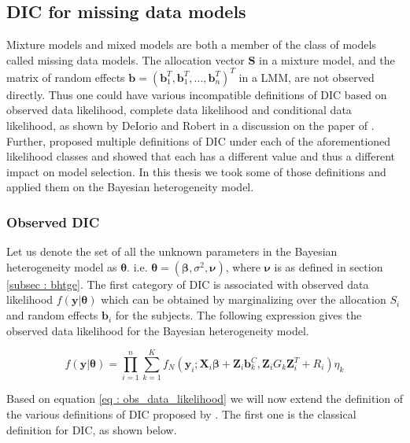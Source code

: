 \subsection{DIC for missing data models}
\label{subsec : DIC_missing_data_models}
Mixture models and mixed models are both a member of the class of models called missing data models. The allocation vector $\boldsymbol{S}$ in a mixture model, and the matrix of random effects $\boldsymbol{b}=(\boldsymbol{b}_1^T, \boldsymbol{b}_1^T, ..., \boldsymbol{b}_n^T)^T$ in a LMM, are not observed directly. Thus one could have various incompatible definitions of DIC based on observed data likelihood, complete data likelihood and conditional data likelihood, as shown by DeIorio and Robert in a discussion on the paper of \citet{spiegelhalter_bayesian_2002}. Further, \citet{celeux_deviance_2006} proposed multiple definitions of DIC under each of the aforementioned likelihood classes and showed that each has a different value and thus a different impact on model selection. In this thesis we took some of those definitions and applied them on the Bayesian heterogeneity model. 

\subsubsection{Observed DIC}
Let us denote the set of all the unknown parameters in the Bayesian heterogeneity model as $\boldsymbol{\theta}$. i.e. $\boldsymbol{\theta} = (\boldsymbol{\beta}, \sigma^2, \boldsymbol{\nu})$, where $\boldsymbol{\nu}$ is as defined in section \ref{subsec : bhtge}. The first category of DIC is associated with observed data likelihood $f(\boldsymbol{y}|\boldsymbol{\theta})$ which can be obtained by marginalizing over the allocation $S_i$ and random effects $\boldsymbol{b}_i$ for the subjects. The following expression gives the observed data likelihood for the Bayesian heterogeneity model.

\begin{equation}
\label{eq : obs_data_likelihood}
f(\boldsymbol{y}|\boldsymbol{\theta}) = \prod_{i=1}^n \sum_{k=1}^K f_N(\boldsymbol{y}_i; \boldsymbol{X}_i\boldsymbol{\beta} + \boldsymbol{Z}_i \boldsymbol{b}_k^C, \boldsymbol{Z}_{i} G_k \boldsymbol{Z}_{i}^T+ R_i) \eta_k
\end{equation}
 
Based on equation \ref{eq : obs_data_likelihood} we will now extend the definition of the various definitions of DIC proposed by \citet{celeux_deviance_2006}. The first one is the classical definition for DIC, as shown below.

